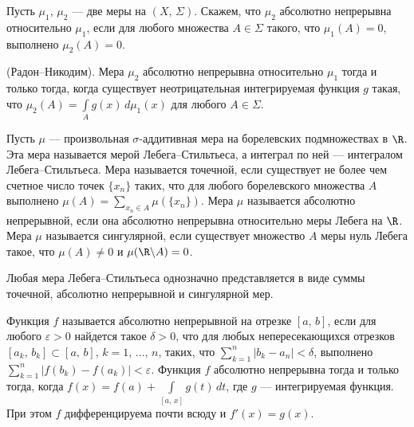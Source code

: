 \documentclass[a4paper
]{article}
\begin{document}
Пусть $\mu _1$, $\mu _2$ --- две меры на $(X, \, \Sigma)$. Скажем,
что $\mu_2$ абсолютно непрерывна относительно $\mu_1$, если для
любого множества $A\in \Sigma$ такого, что $\mu_1(A)=0$, выполнено
$\mu_2(A)=0$.
\begin{Trm} (Радон--Никодим). Мера $\mu_2$ абсолютно непрерывна
относительно $\mu_1$ тогда и только тогда, когда существует
неотрицательная интегрируемая функция $g$ такая, что $\mu_2(A)=
\int \limits _A g(x)\, d\mu_1(x)$ для любого $A\in \Sigma$.
\end{Trm}
Пусть $\mu$ --- произвольная $\sigma$-аддитивная мера на борелевских
подмножествах в $\R$. Эта мера называется мерой Лебега--Стильтьеса,
а интеграл по ней --- интегралом Лебега--Стильтьеса. Мера называется
точечной, если существует не более чем счетное число точек $\{x_n\}$
таких, что для любого борелевского множества $A$ выполнено
$\mu(A)=\sum _{x_n\in A}\mu(\{x_n\})$. Мера $\mu$ называется абсолютно
непрерывной, если она абсолютно непрерывна относительно меры Лебега
на $\R$. Мера $\mu$ называется сингулярной, если существует множество
$A$ меры нуль Лебега такое, что $\mu(A)\ne 0$ и $\mu(\R\backslash
A)=0$.
\begin{Trm}
\label{leb_st_sum3}
Любая мера Лебега--Стильтьеса однозначно представляется в виде
суммы точечной, абсолютно непрерывной и сингулярной мер.
\end{Trm}
Функция $f$ называется абсолютно непрерывной на отрезке $[a, \, b]$,
если для любого $\varepsilon>0$ найдется такое $\delta>0$, что
для любых непересекающихся отрезков $[a_k, \, b_k]\subset [a, \, b]$,
$k=1, \, \dots, \, n$, таких, что $\sum \limits_{k=1}^n|b_k-a_n|
<\delta$, выполнено $\sum \limits_{k=1}^n |f(b_k)-f(a_k)|<\varepsilon$.
Функция $f$ абсолютно непрерывна тогда и только тогда, когда
$f(x)=f(a)+\int \limits_{[a, \, x]}g(t)\, dt$, где $g$ ---
интегрируемая функция. При этом $f$ дифференцируема почти всюду и
$f'(x)=g(x)$.
\end{document}

